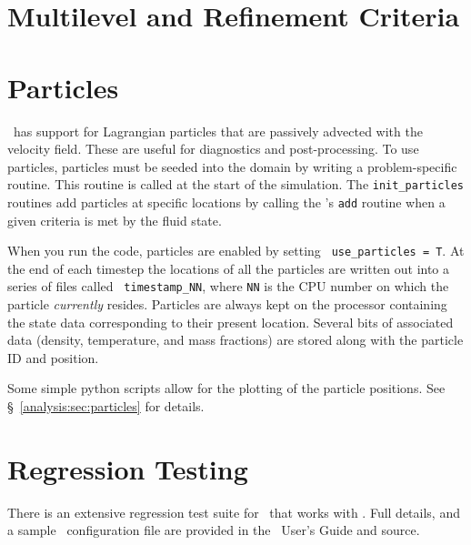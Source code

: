 \section{Multilevel and Refinement Criteria}


\section{Particles}

\label{arch:sec:particles}

\maestro\ has support for Lagrangian particles that are passively
advected with the velocity field.  These are useful for diagnostics
and post-processing.  To use particles, particles must be seeded into
the domain by writing a problem-specific 
routine.  This routine is called at the start of the simulation.  The
{\tt init\_particles} routines add particles at specific locations by
calling the 's {\tt add} routine when a given
criteria is met by the fluid state.

When you run the code, particles are enabled by setting {\tt
  use\_particles = T}.  At the end of each timestep the locations of
all the particles are written out into a series of files called {\tt
  timestamp\_NN}, where {\tt NN} is the CPU number on which the
particle {\em currently} resides.  Particles are always kept on the
processor containing the state data corresponding to their present
location.  Several bits of associated data (density, temperature, and
mass fractions) are stored along with the particle ID and position.

Some simple python scripts allow for the plotting of the particle
positions.  See \S~\ref{analysis:sec:particles} for details.


\section{Regression Testing}

There is an extensive regression test suite for \amrex\ that works with
\maestro.  Full details, and a sample \maestro\ configuration file are
provided in the \amrex\ User's Guide and source.
